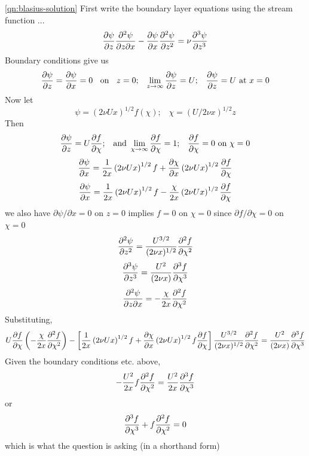 \documentclass[10pt]{report}
\begin{document}
\begin{answer6}
\begin{questionnumber}{\ref{qn:blasius-solution}}
First write the boundary layer equations using the stream function ...
\[
	\pd{\psi}{z}\pd{^{2}\psi}{z\partial x} - \pd{\psi}{x}\pd{^{2}\psi}{z^{2}} =
	\nu \pd{^{3}\psi}{z^{3}}
\]
Boundary conditions give us
\[
	\pd{\psi}{z} = \pd{\psi}{x} = 0 \;\; \text{ on } \;\; z=0;\;\;\; \lim_{z \to \infty } \pd{\psi}{z} = U;\;\;\; \pd{\psi}{z} = U \text{ at } x=0
\]
Now let
\[
	\psi = (2\nu U x)^{{1/2}}f(\chi);\;\;\; \chi = (U/2\nu x)^{1/2}z
\]
Then
\[
	\pd{\psi}{z} = U \pd{f}{\chi};\;\;\; \text{and } \lim_{\chi \to \infty}
	\pd{f}{\chi} = 1;\;\;\; \pd{f}{\chi} = 0\text{ on } \chi=0
\]
\[
	\pd{\psi}{x} = \frac{1}{2x}\left( 2\nu Ux\right)^{{1/2}}f +
	               \pd{\chi}{x} \left( 2\nu Ux\right)^{{1/2}} \pd{f}{\chi}
\]
\[
	\pd{\psi}{x} = \frac{1}{2x}\left( 2\nu Ux\right)^{{1/2}}f -
	               \frac{\chi}{2x} \left( 2\nu Ux\right)^{{1/2}} \pd{f}{\chi}
\]
we also have $\partial\psi/ \partial{x} = 0$ on $z=0$ implies $f=0$ on $\chi=0$ since $\partial f/ \partial \chi = 0$ on $\chi = 0$
\[
\ppd{\psi}{z} = \frac{U^{3/2}}{(2\nu x)^{1/2}} \ppd{f}{\chi}
\]
\[
\pppd{\psi}{z} = \frac{U^{2}}{(2\nu x)} \pppd{f}{\chi}
\]
\[
\ppdd{\psi}{z}{x} = -\frac{\chi}{2x} \ppd{f}{\chi}
\]
Substituting,
\[
	U\pd{f}{\chi}\left( -\frac{\chi}{2x} \ppd{f}{\chi} \right)
	-\left[ \frac{1}{2x}\left( 2\nu Ux\right)^{{1/2}}f +
	               \pd{\chi}{x} \left( 2\nu Ux\right)^{{1/2}}f \pd{f}{\chi}
	\right] \frac{U^{3/2}}{(2\nu x)^{1/2}} \ppd{f}{\chi} =
	\frac{U^{2}}{(2\nu x)} \pppd{f}{\chi}
\]
Given the boundary conditions etc. above,
\[
	-\frac{U^{2}}{2x} f \ppd{f}{\chi} = \frac{U^{2}}{2x} \pppd{f}{\chi}
\]
or
\[
	 \pppd{f}{\chi} + f \ppd{f}{\chi} = 0
\]
which is what the question is asking (in a shorthand form)
\end{questionnumber}

\end{answer6}



\end{document}
